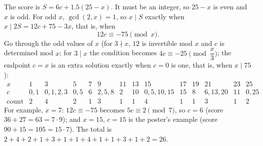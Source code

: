 The score is $S=6c+1.5(25-x)$. It must be an integer, so $25-x$ is even and $x$ is odd. For odd $x$, $\gcd(2,x)=1$, so $x\mid S$ exactly when $x\mid 2S=12c+75-3x$, that is, when
\[
12c\equiv-75\pmod x .
\]
Go through the odd values of $x$ (for $3\nmid x$, $12$ is invertible mod $x$ and $c$ is determined mod $x$; for $3\mid x$ the condition becomes $4c\equiv-25\pmod{\dfrac{x}{3}}$; the endpoint $c=x$ is an extra solution exactly when $c=0$ is one, that is, when $x\mid75$):
\[
\begin{array}{c|ccccccccccccc}
x & 1&3&5&7&9&11&13&15&17&19&21&23&25\\ \hline
c & 0,1 & 0,1,2,3 & 0,5 & 6 & 2,5,8 & 2 & 10 & 0,5,10,15 & 15 & 8 & 6,13,20 & 11 & 0,25\\
\text{count} & 2&4&2&1&3&1&1&4&1&1&3&1&2
\end{array}
\]
For example, $x=7$: $12c\equiv-75$ becomes $5c\equiv2\pmod7$, so $c=6$ (score $36+27=63=7\cdot9$); and $x=15$, $c=15$ is the poster's example (score $90+15=105=15\cdot7$). The total is $2+4+2+1+3+1+1+4+1+1+3+1+2=\boxed{26}$.
